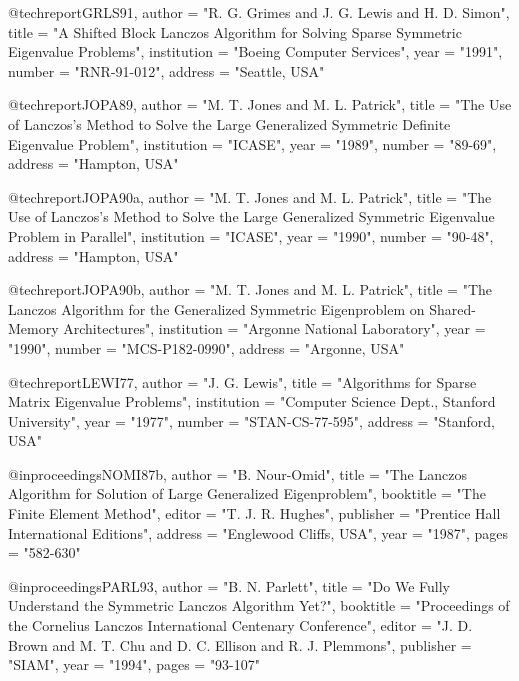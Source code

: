 @techreport{GRLS91,
   author       = "R. G. Grimes and J. G. Lewis and H. D. Simon",
   title        = "{A Shifted Block Lanczos Algorithm for Solving Sparse
                   Symmetric Eigenvalue Problems}",
   institution  = "Boeing Computer Services",
   year         = "1991",
   number       = "RNR-91-012",
   address      = "Seattle, USA"}

@techreport{JOPA89,
   author       = "M. T. Jones and M. L. Patrick",
   title        = "{The Use of Lanczos's Method to Solve the Large      
                   Generalized Symmetric Definite Eigenvalue Problem}",
   institution  = "ICASE",
   year         = "1989",
   number       = "89-69",
   address      = "Hampton, USA"}

@techreport{JOPA90a,
   author       = "M. T. Jones and M. L. Patrick",
   title        = "{The Use of Lanczos's Method to Solve the Large
                   Generalized Symmetric Eigenvalue
                   Problem in Parallel}",
   institution  = "ICASE",
   year         = "1990",
   number       = "90-48",
   address      = "Hampton, USA"}

@techreport{JOPA90b,
   author       = "M. T. Jones and M. L. Patrick",
   title        = "{The Lanczos Algorithm for the Generalized 
                   Symmetric Eigenproblem on Shared-Memory
                   Architectures}",
   institution  = "Argonne National Laboratory",
   year         = "1990",
   number       = "MCS-P182-0990",
   address      = "Argonne, USA"}

@techreport{LEWI77,
   author       = "J. G. Lewis",
   title        = "{Algorithms for Sparse Matrix Eigenvalue Problems}",
   institution  = "Computer Science Dept., Stanford University",
   year         = "1977",
   number       = "STAN-CS-77-595",
   address      = "Stanford, USA"}

@inproceedings{NOMI87b,
   author       = "B. Nour-Omid",
   title        = "{The Lanczos Algorithm for Solution of 
                   Large Generalized Eigenproblem}",
   booktitle    = "The Finite Element Method",
   editor       = "T. J. R. Hughes",
   publisher    = "Prentice Hall International Editions",
   address      = "Englewood Cliffs, USA",
   year         = "1987",
   pages        = "582-630"}

@inproceedings{PARL93,
   author       = "B. N. Parlett",
   title        = "{Do We Fully Understand the Symmetric 
                   Lanczos Algorithm Yet?}",
   booktitle    = "Proceedings of the Cornelius Lanczos
                   International Centenary Conference",
   editor       = "J. D. Brown and M. T. Chu and D. C. Ellison
                   and R. J. Plemmons",
   publisher    = "SIAM",
   year         = "1994",
   pages        = "93-107"}

